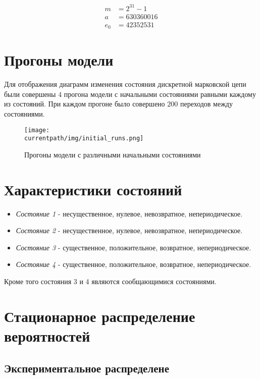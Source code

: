 \begin{align*}
    m & = 2^{31} - 1 \\
    a & = 630360016 \\
    e_0 & = 42352531
\end{align*}

\section*{Прогоны модели}

Для отображения диаграмм изменения состояния дискретной марковской цепи были совершены $4$ прогона модели
с начальными состояниями равными каждому из состояний. При каждом прогоне было совершено $200$ переходов между
состояниями.

\begin{figure}[h!]
    \centering
        \texttt{[image: \\currentpath/img/initial\_runs.png]}
    \caption{Прогоны модели с различными начальными состояниями}
\end{figure}

\section*{Характеристики состояний}

\begin{itemize}
    \item \textit{Состояние 1} - несущественное, нулевое, невозвратное, непериодическое.
    \item \textit{Состояние 2} - несущественное, нулевое, невозвратное, непериодическое.
    \item \textit{Состояние 3} - существенное, положительное, возвратное, непериодическое.
    \item \textit{Состояние 4} - существенное, положительное, возвратное, непериодическое.
\end{itemize}

Кроме того состояния 3 и 4 являются сообщающимися состояниями.

\section*{Стационарное распределение вероятностей}

\subsection*{Экспериментальное распределене}

